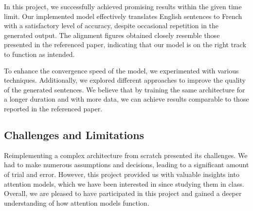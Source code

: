 In this project, we successfully achieved promising results within the given time limit. Our implemented model effectively translates English sentences to French with a satisfactory level of accuracy, despite occasional repetition in the generated output. The alignment figures obtained closely resemble those presented in the referenced paper, indicating that our model is on the right track to function as intended.

To enhance the convergence speed of the model, we experimented with various techniques. Additionally, we explored different approaches to improve the quality of the generated sentences. We believe that by training the same architecture for a longer duration and with more data, we can achieve results comparable to those reported in the referenced paper.

\subsection{Challenges and Limitations}
Reimplementing a complex architecture from scratch presented its challenges. We had to make numerous assumptions and decisions, leading to a significant amount of trial and error. However, this project provided us with valuable insights into attention models, which we have been interested in since studying them in class. Overall, we are pleased to have participated in this project and gained a deeper understanding of how attention models function.
